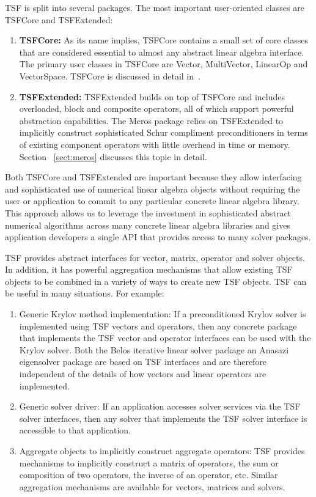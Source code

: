 \documentclass[acmtoms,acmnow]{acmtrans2m}
\begin{document}
TSF is split into several packages.  The most important user-oriented
classes are TSFCore and TSFExtended:
\begin{enumerate}
\item {\bf TSFCore:} As its name implies, TSFCore contains a small set
of core classes that are considered essential to almost any abstract
linear algebra interface.  The primary user classes in TSFCore are
Vector, MultiVector, LinearOp and VectorSpace. TSFCore is discussed in
detail in~\cite{TSFCore}.
\item {\bf TSFExtended:} TSFExtended builds on top of TSFCore and
includes overloaded, block and composite operators, all of
which support powerful abstraction capabilities.  The Meros package
relies on TSFExtended to implicitly construct sophisticated
Schur compliment preconditioners in terms of existing component
operators with little overhead in time or memory.  Section
~\ref{sect:meros} discusses this topic in detail.
\end{enumerate}

Both TSFCore and TSFExtended are important because they allow
interfacing and sophisticated use of numerical linear algebra objects
without requiring the user or application to commit to any particular
concrete linear algebra library.  This approach allows us to leverage
the investment in sophisticated abstract numerical algorithms across
many concrete linear algebra libraries and gives application
developers a single API that provides access to many solver packages.

TSF provides abstract interfaces for vector, matrix, operator and 
solver objects.  In addition, it has powerful aggregation mechanisms 
that allow existing TSF objects to be combined in a variety of ways 
to create new TSF objects.  TSF can be useful in many situations.  
For example:
\begin{enumerate}

\item Generic Krylov method implementation:  If a preconditioned Krylov solver 
is implemented using TSF vectors and operators, then any concrete package 
that implements the TSF vector and operator interfaces can be used 
with the Krylov solver.  Both the Belos iterative linear solver
package an Anasazi eigensolver package are based on TSF interfaces and
are therefore independent of the details of how vectors and linear
operators are implemented.  

\item Generic solver driver:  If an application accesses solver 
services via the TSF solver interfaces, then any solver that 
implements the TSF solver interface is accessible to that application.

\item Aggregate objects to implicitly construct aggregate operators: 
TSF provides mechanisms to implicitly construct a matrix of operators, 
the sum or composition of two operators, the inverse of an operator, 
etc.  Similar aggregation mechanisms are available for vectors, matrices
and solvers.

\end{enumerate}
\end{document}
